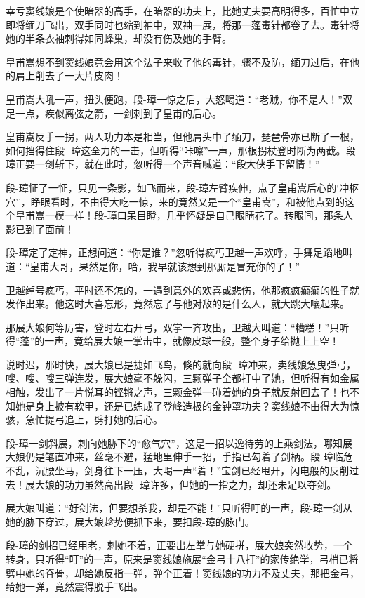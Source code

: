 \documentclass[12pt,oneside]{book}
\begin{document}
幸亏窦线娘是个使暗器的高手，在暗器的功夫上，比她丈夫要高明得多，百忙中立即将缅刀飞出，双手同时也缩到袖中，双袖一展，将那一蓬毒针都卷了去。毒针将她的半条衣袖刺得如同蜂巢，却没有伤及她的手臂。

皇甫嵩想不到窦线娘竟会用这个法子来收了他的毒针，骤不及防，缅刀过后，在他的肩上削去了一大片皮肉！

皇甫嵩大吼一声，扭头便跑，段-璋一惊之后，大怒喝道：``老贼，你不是人！''双足一点，疾似离弦之箭，一剑刺到了皇甫的后心。

皇甫嵩反手一拐，两人功力本是相当，但他肩头中了缅刀，琵琶骨亦已断了一根，如何挡得住段-
璋这全力的一击，但听得``咔嚓''一声，那根拐杖登时断为两截。段-璋正要一剑斩下，就在此时，忽听得一个声音喊道：``段大侠手下留情！''

段-璋怔了一怔，只见一条影，如飞而来，段-璋左臂疾伸，点了皇甫嵩后心的`冲枢穴''，睁眼看时，不由得大吃一惊，来的竟然又是一个``皇甫嵩''，和被他点到的这个皇甫嵩一模一样！段-璋口呆目瞪，几乎怀疑是自己眼睛花了。转眼间，那条人影已到了面前！

段-璋定了定神，正想问道：``你是谁？''忽听得疯丐卫越一声欢呼，手舞足蹈地叫道：``皇甫大哥，果然是你，哈，我早就该想到那厮是冒充你的了！''

卫越绰号疯丐，平时还不怎的，一遇到意外的欢喜或悲伤，他那疯疯癫癫的性子就发作出来。他这时大喜忘形，竟然忘了与他对敌的是什么人，就大跳大嚷起来。

那展大娘何等厉害，登时左右开弓，双掌一齐攻出，卫越大叫道：``糟糕！''只听得``蓬''的一声，竟给展大娘一掌击中，就像皮球一般，整个身子给抛上上空！

说时迟，那时快，展大娘已是捷如飞鸟，倏的就向段-
璋冲来，卖线娘急曳弹弓，嗖、嗖、嗖三弹连发，展大娘毫不躲闪，三颗弹子全都打中了她，但听得有如金属相触，发出了一片悦耳的铿锵之声，三颗金弹一碰着她的身子就反射回去了！也不知她是身上披有软甲，还是已练成了登峰造极的金钟罩功夫？窦线娘不由得大为惊骇，急忙提弓追上，劈打她的后心。

段-璋一剑斜展，刺向她胁下的``愈气穴''，这是一招以逸待劳的上乘剑法，哪知展大娘仍是笔直冲来，丝毫不避，猛地里伸手一招，手指已勾着了剑柄。段-璋临危不乱，沉腰坐马，剑身往下一压，大喝一声``着！''宝剑已经甩开，闪电般的反削过去！展大娘的功力虽然高出段-
璋许多，但她的一指之力，却还未足以夺剑。

展大娘叫道：``好剑法，但要想杀我，却是不能！''只听得叮的一声，段-璋一剑从她的胁下穿过，展大娘趁势便抓下来，要扣段-璋的脉门。

段-璋的剑招已经用老，刺她不着，正要出左掌与她硬拼，展大娘突然收势，一个转身，只听得``叮''的一声，原来是窦线娘施展``金弓十八打''的家传绝学，弓梢已将劈中她的脊骨，却给她反指一弹，弹个正着！窦线娘的功力不及丈夫，那把金弓，给她一弹，竟然震得脱手飞出。
\end{document}
